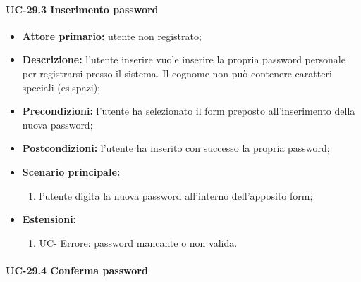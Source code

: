 \paragraph{UC-29.3 Inserimento password}

	\begin{itemize}
		\item \textbf{Attore primario:} utente non registrato;

		\item \textbf{Descrizione:} l'utente inserire vuole inserire la propria password personale per registrarsi presso il sistema. Il cognome non può contenere caratteri speciali (es.spazi);

		\item \textbf{Precondizioni:} l'utente ha selezionato il form preposto all'inserimento della nuova password;

		\item \textbf{Postcondizioni:} l'utente ha inserito con successo la propria password;

		\item \textbf{Scenario principale:}
			\begin{enumerate}
		  		\item l'utente digita la nuova password all'interno dell'apposito form;
	  		\end{enumerate}
		\item \textbf{Estensioni:}
	  		\begin{enumerate}
		  		\item UC- Errore: password mancante o non valida.
	  		\end{enumerate}
	\end{itemize}

\paragraph{UC-29.4 Conferma password}

